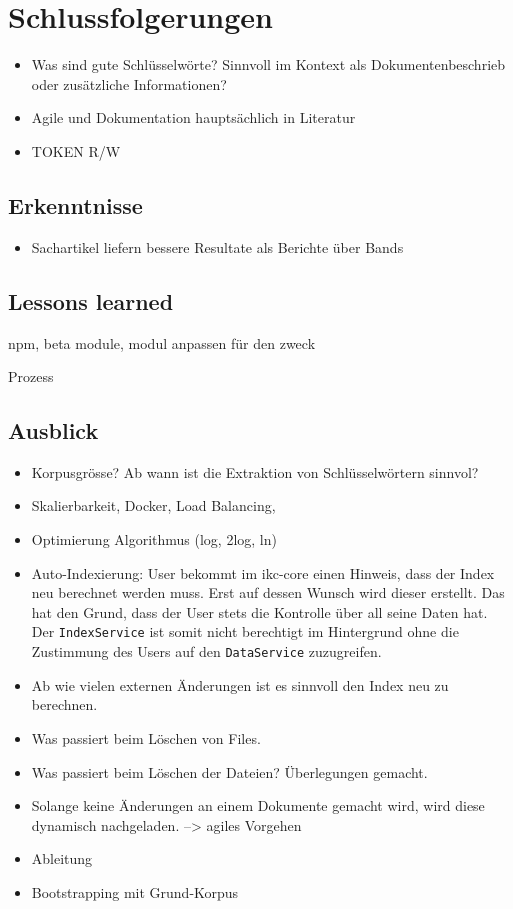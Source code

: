 
\chapter{Schlussfolgerungen}

\begin{itemize}
    \item Was sind gute Schlüsselwörte? Sinnvoll im Kontext als Dokumentenbeschrieb oder zusätzliche Informationen?
    \item Agile und Dokumentation hauptsächlich in Literatur
    \item TOKEN R/W
\end{itemize}

\section{Erkenntnisse}

\begin{itemize}
    \item Sachartikel liefern bessere Resultate als Berichte über Bands
\end{itemize}

\section{Lessons learned}

npm, beta module, modul anpassen für den zweck

Prozess

\section{Ausblick}

\begin{itemize}
    \item Korpusgrösse? Ab wann ist die Extraktion von Schlüsselwörtern sinnvol?
    \item Skalierbarkeit, Docker, Load Balancing, 
    \item Optimierung Algorithmus (log, 2log, ln)
    \item Auto-Indexierung: User bekommt im \gls{ikc-core} einen Hinweis, dass der Index neu berechnet werden muss. Erst auf dessen Wunsch wird dieser erstellt. Das hat den Grund, dass der User stets die Kontrolle über all seine Daten hat. Der \texttt{IndexService} ist somit nicht berechtigt im Hintergrund ohne die Zustimmung des Users auf den \texttt{DataService} zuzugreifen.
    \item Ab wie vielen externen Änderungen ist es sinnvoll den Index neu zu berechnen.
    \item Was passiert beim Löschen von Files.
    \item Was passiert beim Löschen der Dateien? Überlegungen gemacht.
    \item Solange keine Änderungen an einem Dokumente gemacht wird, wird diese dynamisch nachgeladen. --> agiles Vorgehen
    \item Ableitung
    \item Bootstrapping mit Grund-Korpus
\end{itemize}

